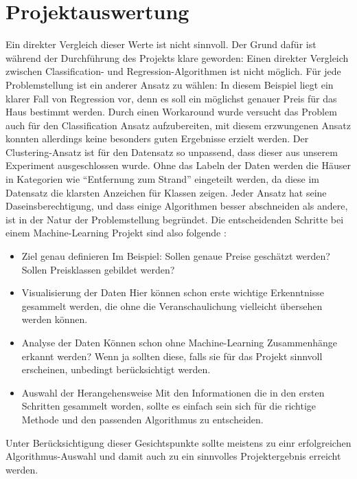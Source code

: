 \section{Projektauswertung}
\label{projektauswertung}
Ein direkter Vergleich dieser Werte ist nicht sinnvoll.
Der Grund dafür ist während der Durchführung des Projekts klare geworden:
Einen direkter Vergleich zwischen Classification- und Regression-Algorithmen ist nicht möglich. Für jede Problemstellung ist ein anderer Ansatz zu wählen: 
In diesem Beispiel liegt ein klarer Fall von Regression vor, denn es soll ein möglichst genauer Preis für das Haus bestimmt werden. Durch einen Workaround wurde versucht das Problem auch für den Classification Ansatz aufzubereiten, mit diesem erzwungenen Ansatz konnten allerdings keine besonders guten Ergebnisse erzielt werden. Der Clustering-Ansatz ist für den Datensatz so unpassend, dass dieser aus unserem Experiment ausgeschlossen wurde. Ohne das Labeln der Daten werden die Häuser in Kategorien wie “Entfernung zum Strand” eingeteilt werden, da diese im Datensatz die klarsten Anzeichen für Klassen zeigen. 
\newline
Jeder Ansatz hat seine Daseinsberechtigung, und dass einige Algorithmen besser abschneiden als andere, ist in der Natur der Problemstellung begründet. 
Die entscheidenden Schritte bei einem Machine-Learning Projekt sind also folgende :
\begin{itemize}
\item Ziel genau definieren \newline
Im Beispiel: Sollen genaue Preise geschätzt werden? Sollen Preisklassen gebildet werden?
\item Visualisierung der Daten \newline
Hier können schon erste wichtige Erkenntnisse gesammelt werden, die ohne die Veranschaulichung vielleicht übersehen werden können.
\item Analyse der Daten \newline
Können schon ohne Machine-Learning Zusammenhänge erkannt werden? 
Wenn ja sollten diese, falls sie für das Projekt sinnvoll erscheinen, unbedingt berücksichtigt werden.
\item Auswahl der Herangehensweise \newline
Mit den Informationen die in den ersten Schritten gesammelt worden, sollte es einfach sein sich für die richtige Methode und den passenden Algorithmus zu entscheiden.
\end{itemize}
Unter Berücksichtigung dieser Gesichtspunkte sollte  meistens zu einr erfolgreichen Algorithmus-Auswahl und damit auch zu ein sinnvolles Projektergebnis erreicht werden.

